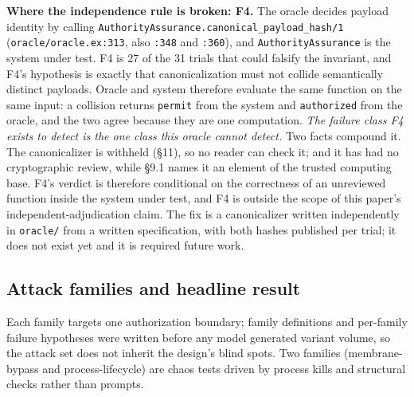 \documentclass[11pt]{article}
\begin{document}
\textbf{Where the independence rule is broken: F4.} The oracle decides payload identity by calling
\texttt{AuthorityAssurance.canonical\_payload\_hash/1} (\texttt{oracle/oracle.ex:313}, also
\texttt{:348} and \texttt{:360}), and \texttt{AuthorityAssurance} is the system under test. F4 is
27 of the 31 trials that could falsify the invariant, and F4's hypothesis is exactly that
canonicalization must not collide semantically distinct payloads. Oracle and system therefore
evaluate the same function on the same input: a collision returns \texttt{permit} from the system
and \texttt{authorized} from the oracle, and the two agree because they are one computation. \emph{The
failure class F4 exists to detect is the one class this oracle cannot detect.} Two facts compound
it. The canonicalizer is withheld (\S11), so no reader can check it; and it has had no
cryptographic review, while \S9.1 names it an element of the trusted computing base. F4's verdict
is therefore conditional on the correctness of an unreviewed function inside the system under test,
and F4 is outside the scope of this paper's independent-adjudication claim. The fix is a
canonicalizer written independently in \texttt{oracle/} from a written specification, with both
hashes published per trial; it does not exist yet and it is required future work.

\subsection{Attack families and headline result}\label{attack-families-and-headline-result}

Each family targets one authorization boundary; family definitions and per-family failure
hypotheses were written before any model generated variant volume, so the attack set does not
inherit the design's blind spots. Two families (membrane-bypass and process-lifecycle) are
chaos tests driven by process kills and structural checks rather than prompts.
\end{document}

